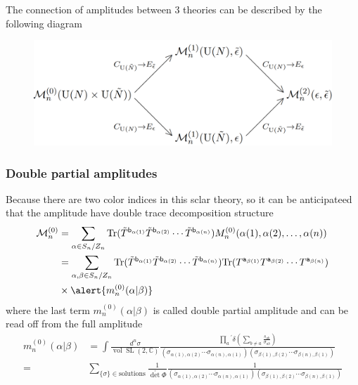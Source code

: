 \documentclass{beamer}
\begin{document}
\begin{frame}
    The connection of amplitudes between 3 theories can be described by the following diagram 
    \begin{figure}[htb]
        \centering
        \includegraphics[width=1\linewidth]{main.png}
    \end{figure}
\end{frame}
\begin{frame}
    \frametitle{Double partial amplitudes}
    Because there are two color indices in this sclar theory, so it can be anticipateed that the amplitude
    have double trace decomposition structure
    \begin{align*}
        \mathcal{M}_n^{(0)}&=\sum_{\alpha\in S_n/Z_n}\mathrm{Tr}(\tilde{T}^{\mathsf{b}_{\alpha(1)}}\tilde{T}^{\mathsf{b}_{\alpha(2)}}\cdots\tilde{T}^{\mathsf{b}_{\alpha(n)}})M_n^{(0)}(\alpha(1),\alpha(2),\ldots,\alpha(n))\\
        &=\sum_{\alpha,\beta\in S_n/Z_n}\mathrm{Tr}(\tilde{T}^{\mathsf{b}_{\alpha(1)}}\tilde{T}^{\mathsf{b}_{\alpha(2)}}\cdots\tilde{T}^{\mathsf{b}_{\alpha(n)}})\text{Tr}(T^{\mathtt{a}_{\beta(1)}}T^{\mathtt{a}_{\beta(2)}}\cdots T^{\mathtt{a}_{\beta(n)}})\\
        &\times \alert{m_n^{(0)}(\alpha|\beta)}
    \end{align*} 
    where the last term $m_n^{(0)}(\alpha|\beta)$ is called \alert{double partial amplitude} and can be read off from the full amplitude
    \begin{align*}
    m_{n}^{(0)}(\alpha|\beta)&=\int\frac{d^{n}\sigma}{\operatorname{vol}\operatorname{SL}(2,\mathbb{C})}\frac{\prod_{a}{}^{\prime}\delta(\sum_{b\neq a}\frac{s_{ab}}{\sigma_{ab}})}{(\sigma_{\alpha(1),\alpha(2)}\cdots\sigma_{\alpha(n),\alpha(1)})(\sigma_{\beta(1),\beta(2)}\cdots\sigma_{\beta(n),\beta(1)})}\\
    =&\sum_{\{\sigma\}\in\mathrm{solutions}}\frac1{\det^{\prime}\Phi}\frac{1}{(\sigma_{\alpha(1),\alpha(2)}\cdots\sigma_{\alpha(n),\alpha(1)})(\sigma_{\beta(1),\beta(2)}\cdots\sigma_{\beta(n),\beta(1)})}
    \end{align*}

\end{frame}
\end{document}
